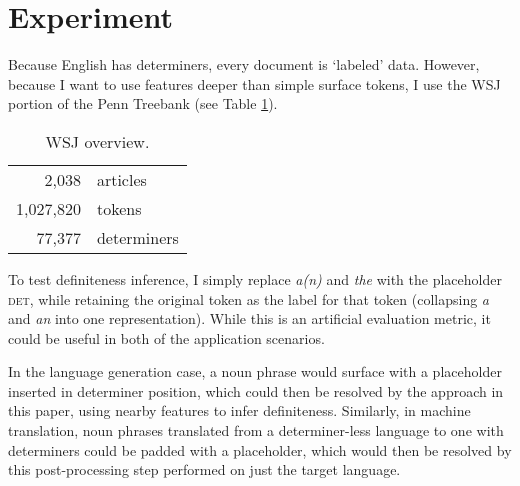 \documentclass[11pt]{article}\usepackage{graphicx, color}
\begin{document}
\section{Experiment}
Because English has determiners, every document is `labeled' data. However, because I want to use features deeper than simple surface tokens, I use the WSJ portion of the Penn Treebank (see Table \ref{tab:wsjoverview}).
\begin{table}[H]
  \centering
  \begin{tabular}{r@{$\;\,$}l}
    2,038 & articles \\
    1,027,820 & tokens \\
    77,377 & determiners \\
  \end{tabular}
  \caption{WSJ overview.}
  \label{tab:wsjoverview}
\end{table}
\newcommand\detplaceholder{\guillemotleft\textsc{det}\guillemotright}
To test definiteness inference, I simply replace \emph{a(n)} and \emph{the} with the placeholder \detplaceholder{}, while retaining the original token as the label for that token (collapsing \emph{a} and \emph{an} into one representation). While this is an artificial evaluation metric, it could be useful in both of the application scenarios.

In the language generation case, a noun phrase would surface with a placeholder inserted in determiner position, which could then be resolved by the approach in this paper, using nearby features to infer definiteness. Similarly, in machine translation, noun phrases translated from a determiner-less language to one with determiners could be padded with a placeholder, which would then be resolved by this post-processing step performed on just the target language.
\end{document}
